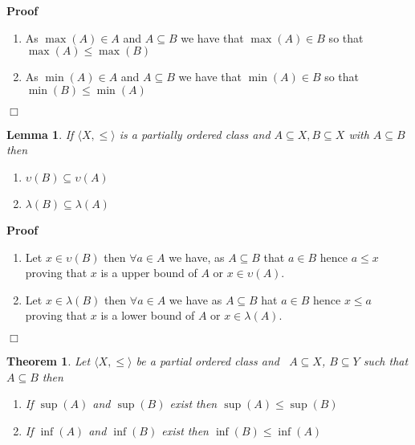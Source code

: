 \documentclass{book}
\newenvironment{proof}{\noindent\textbf{Proof\ }}{\hspace*{\fill}$\Box$\medskip}
\newtheorem{lemma}{Lemma}
\newtheorem{theorem}{Theorem}
\begin{document}
\begin{proof}
  
  \begin{enumerate}
    \item As $\max (A) \in A$ and $A \subseteq B$ we have that $\max (A) \in
    B$ so that $\max (A) \leqslant \max (B)$
    
    \item As $\min (A) \in A$ and $A \subseteq B$ we have that $\min (A) \in
    B$ so that $\min (B) \leqslant \min (A)$
  \end{enumerate}
\end{proof}

\begin{lemma}
  \label{order lower upper bound and inclusion}If $\langle X, \leqslant
  \rangle$ is a partially ordered class and $A \subseteq X, B \subseteq X$
  with $A \subseteq B$ then
  \begin{enumerate}
    \item $\upsilon (B) \subseteq \upsilon (A)$
    
    \item $\lambda (B) \subseteq \lambda (A)$
  \end{enumerate}
\end{lemma}

\begin{proof}
  
  \begin{enumerate}
    \item Let $x \in \upsilon (B)$ then $\forall a \in A$ we have, as $A
    \subseteq B$ that $a \in B$ hence $a \leqslant x$ proving that $x$ is a
    upper bound of $A$ or $x \in \upsilon (A)$.
    
    \item Let $x \in \lambda (B)$ then $\forall a \in A$ we have as $A
    \subseteq B$ hat $a \in B$ hence $x \leqslant a$ proving that $x$ is a
    lower bound of $A$ or $x \in \lambda (A)$.
  \end{enumerate}
\end{proof}

\begin{theorem}
  \label{order sup,inf and inclusion}Let $\langle X, \leqslant \rangle$ be a
  partial ordered class and \ $A \subseteq X$, $B \subseteq Y$ such that $A
  \subseteq B$ then
  \begin{enumerate}
    \item If $\sup (A)$ and $\sup (B)$ exist then $\sup (A) \leqslant \sup
    (B)$
    
    \item If $\inf (A)$ and $\inf (B)$ exist then $\inf (B) \leqslant \inf
    (A)$
  \end{enumerate}
\end{theorem}
\end{document}
